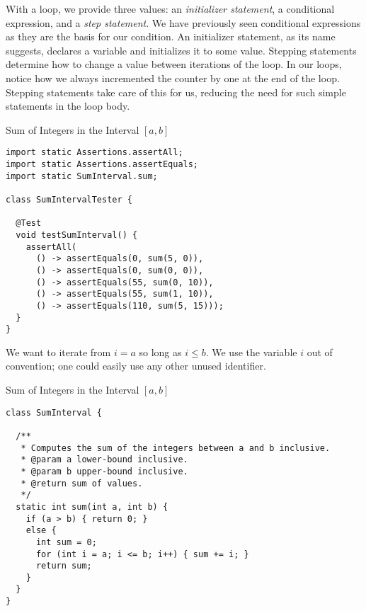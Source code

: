 With a  loop, we provide three values: an \textit{initializer statement}, a conditional expression, and a \textit{step statement}. We have previously seen conditional expressions as they are the basis for our  condition. An initializer statement, as its name suggests, declares a variable and initializes it to some value. Stepping statements determine how to change a value between iterations of the loop. In our  loops, notice how we always incremented the counter by one at the end of the loop. Stepping statements take care of this for us, reducing the need for such simple statements in the loop body.


\begin{cl}{Sum of Integers in the Interval $[a, b]$}
\begin{lstlisting}[language=MyJava]
import static Assertions.assertAll;
import static Assertions.assertEquals;
import static SumInterval.sum;

class SumIntervalTester {

  @Test
  void testSumInterval() {
    assertAll(
      () -> assertEquals(0, sum(5, 0)),
      () -> assertEquals(0, sum(0, 0)),
      () -> assertEquals(55, sum(0, 10)),
      () -> assertEquals(55, sum(1, 10)),
      () -> assertEquals(110, sum(5, 15)));
  }
}
\end{lstlisting}
\end{cl}

We want to iterate from $i = a$ so long as $i \leq b$. We use the variable $i$ out of convention; one could easily use any other unused identifier.

\begin{cl}{Sum of Integers in the Interval $[a, b]$}
\begin{lstlisting}[language=MyJava]
class SumInterval {

  /**
   * Computes the sum of the integers between a and b inclusive.
   * @param a lower-bound inclusive.
   * @param b upper-bound inclusive.
   * @return sum of values.
   */
  static int sum(int a, int b) {
    if (a > b) { return 0; } 
    else {
      int sum = 0;
      for (int i = a; i <= b; i++) { sum += i; }
      return sum;
    }
  }
}
\end{lstlisting}
\end{cl}

